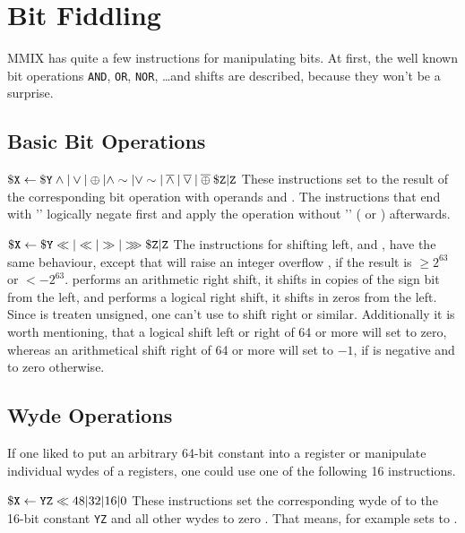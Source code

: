 \section{Bit Fiddling}

MMIX has quite a few instructions for manipulating bits. At first, the well known bit operations {\tt AND}, {\tt OR}, {\tt NOR}, \dots and shifts are described, because they won't be a surprise.

\subsection{Basic Bit Operations}

\instrtbl
	{}
	{${\tt \$X} \leftarrow {\tt \$Y} \land|\lor|\oplus|\land \sim|\lor \sim|\mathbin{\overline\land}|\mathbin{\overline\lor}|\mathbin{\overline\oplus} {\tt \$Z}{\tt|Z}$}
\noindent These instructions set  to the result of the corresponding bit operation with operands  and . The instructions that end with '' logically negate  first and apply the operation without '' ( or ) afterwards. \citep[pg. 7]{mmix-doc}

\instrtbl
	{}
	{${\tt \$X} \leftarrow {\tt \$Y} \ll|\ll|\gg|\ggg {\tt \$Z}{\tt|Z}$}
\noindent The instructions for shifting left,  and , have the same behaviour, except that  will raise an integer overflow , if the result is $\ge 2^{63}$ or $< -2^{63}$.  performs an arithmetic right shift, \ie it shifts in copies of the sign bit from the left, and  performs a logical right shift, \ie it shifts in zeros from the left. Since  is treaten unsigned, one can't use  to shift right or similar. Additionally it is worth mentioning, that a logical shift left or right of 64 or more will set  to zero, whereas an arithmetical shift right of 64 or more will set  to $-1$, if  is negative and to zero otherwise. \citep[pg. 10]{mmix-doc}

\subsection{Wyde Operations}

If one liked to put an arbitrary 64-bit constant into a register or manipulate individual wydes of a registers, one could use one of the following 16 instructions.

\instrtbl
	{}
	{${\tt \$X} \leftarrow {\tt YZ} \ll 48|32|16|0$}
\noindent These instructions set the corresponding wyde of  to the 16-bit constant {\tt YZ} and all other wydes to zero \citep[pg. 7]{mmix-doc}. That means, for example  sets  to .

